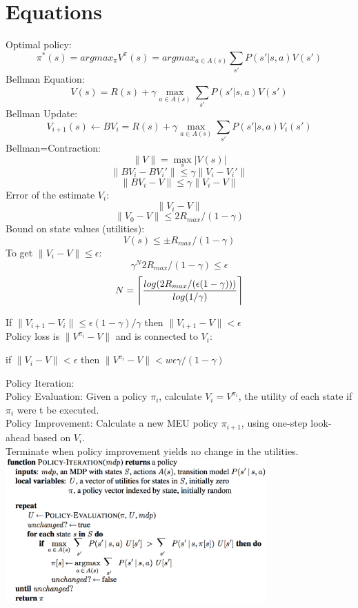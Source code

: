 \documentclass[8pt]{article}
\DeclarePairedDelimiter{\ceil}{\lceil}{\rceil}
\newcommand{\norm}[1]{\lVert#1\rVert}
\begin{document}
\section{Equations}

Optimal policy:
    $$ \pi^*(s) = argmax_{\pi} V^{\pi}(s) = argmax_{a \in A(s)} \sum_{s'} P(s' | s, a) V(s') $$
Bellman Equation:
    $$ V(s) = R(s) + \gamma \max_{a \in A(s)} \sum_{s'} P(s' | s, a) V(s') $$
Bellman Update:
    $$ V_{i+1}(s) \leftarrow B V_i = R(s) + \gamma \max_{a \in A(s)} \sum_{s'} P(s' | s, a) V_i(s') $$
Bellman=Contraction:
    $$ \norm{V} = \max_s \lvert V(s) \rvert $$
    $$ \norm{B V_i - B V_i'} \leq \gamma \norm{V_i - V_i'} $$
    $$ \norm{B V_i - V} \leq \gamma \norm{V_i - V} $$
Error of the estimate $V_i$:
    $$ \norm{V_i - V} $$
    $$ \norm{V_0 - V} \leq 2 R_{max} / (1 - \gamma) $$
Bound on state values (utilities):
    $$ V(s) \leq \pm R_{max} / (1 - \gamma) $$
To get $\norm{V_i - V} \leq \epsilon$:
    $$ \gamma^N 2 R_{max} / (1 - \gamma) \leq \epsilon $$
    $$ N = \ceil[\Bigg]{\frac{log(2R_{max}/(\epsilon(1-\gamma)))}{log(1/\gamma)}} $$

If $\norm{V_{i+1} - V_i} \leq \epsilon (1 - \gamma) / \gamma$ then $\norm{V_{i+1} - V} < \epsilon$ \\

Policy loss is $\norm{V^{\pi_i} - V}$ and is connected to $V_i$:
\begin{center}
    if $\norm{V_i - V} < \epsilon$ then $\norm{V^{\pi_i} - V} < w\epsilon\gamma/(1-\gamma)$
\end{center}

\noindent Policy Iteration: \\
    \indent Policy Evaluation: Given a policy $\pi_i$, calculate $V_i = V^{\pi_i}$, the utility of each state if $\pi_i$ were t be executed. \\
    \indent Policy Improvement: Calculate a new MEU policy $\pi_{i+1}$, using one-step look-ahead based on $V_i$. \\
    \indent Terminate when policy improvement yields no change in the utilities. \\
\includegraphics[width=10cm]{pics/policy_iteration.png}
\end{document}

